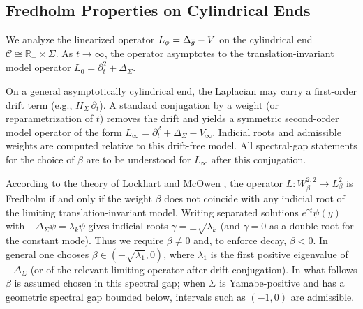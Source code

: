 \subsection{Fredholm Properties on Cylindrical Ends}
We analyze the linearized operator $L_\phi = \Delta_{\overline{g}} - V$ on the cylindrical end $\mathcal{C} \cong \mathbb{R}_+ \times \Sigma$. As $t \to \infty$, the operator asymptotes to the translation-invariant model operator $L_0 = \partial_t^2 + \Delta_\Sigma$.
\begin{remark}
On a general asymptotically cylindrical end, the Laplacian may carry a first-order drift term (e.g., $H_\Sigma\,\partial_t$). A standard conjugation by a weight (or reparametrization of $t$) removes the drift and yields a symmetric second-order model operator of the form $L_\infty = \partial_t^2 + \Delta_\Sigma - V_\infty$. Indicial roots and admissible weights are computed relative to this drift-free model. All spectral-gap statements for the choice of $\beta$ are to be understood for $L_\infty$ after this conjugation.
\end{remark}
According to the theory of Lockhart and McOwen \cite{lockhartmccowen1985}, the operator $L: W^{2,2}_\beta \to L^2_\beta$ is Fredholm if and only if the weight $\beta$ does not coincide with any indicial root of the limiting translation-invariant model. Writing separated solutions $e^{\gamma t}\psi(y)$ with $-\Delta_\Sigma\psi=\lambda_k\psi$ gives indicial roots $\gamma=\pm\sqrt{\lambda_k}$ (and $\gamma=0$ as a double root for the constant mode). Thus we require $\beta\ne 0$ and, to enforce decay, $\beta<0$. In general one chooses $\beta\in(-\sqrt{\lambda_1},0)$, where $\lambda_1$ is the first positive eigenvalue of $-\Delta_\Sigma$ (or of the relevant limiting operator after drift conjugation). In what follows $\beta$ is assumed chosen in this spectral gap; when $\Sigma$ is Yamabe-positive and has a geometric spectral gap bounded below, intervals such as $(-1,0)$ are admissible.

